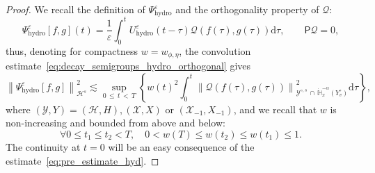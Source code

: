 \documentclass[10pt]{amsart}
\theoremstyle{definition}\newtheorem{defi}[theo]{Definition}\newtheorem{rema}[theo]{Remark}\newtheorem{exam}[theo]{Example}\newtheorem{exem}[theo]{Example}\newtheorem{nota}[theo]{Notation}
\newcommand{\hyd}{\mathrm{hydro}}
\renewcommand{\d}{\mathrm{d}}
\newcommand{\bbH}{\mathbb{H}}
\newcommand{\XX}{\mathcal{X}}
\newcommand{\HH}{\mathcal{H}}
\newcommand{\PP}{\mathsf{P}}
\newcommand{\QQ}{\mathcal{Q}}
\newcommand{\VV}{\mathcal{Y}}
\newcommand{\HHH}{\mathscr{H}}
\newcommand{\Ss}{H}
\newcommand{\SSs}{\HH}
\newcommand{\rSSSs}[1]{\HHH^{#1}}
\newcommand{\Sl}{X}
\newcommand{\SSl}{\XX}
\newcommand{\Sg}{Y}
\newcommand{\Sgm}{Y^{\circ}}
\newcommand{\SSg}{\VV}
\newcommand{\rSSgm}[1]{\VV^{\circ, #1}}
\renewcommand*\le{\leqslant}
\renewcommand*\leq{\leqslant}
\newcommand*\eps{{\varepsilon}}
\let\oldforall\forall
\renewcommand*{\forall}{\mathrel{\oldforall}}
\begin{document}
\begin{proof}
We recall the definition of $\Psi^\eps_\hyd$ and the orthogonality property of $\QQ$:
\[
\Psi^\eps_\hyd [f, g](t) = \frac{1}{\eps} \int_0^t U^\eps_\hyd(t-\tau) \QQ(f(\tau), g(\tau)) \d \tau, \qquad \PP \QQ = 0,
\]
thus, denoting for compactness $w = w_{\phi, \eta}$, the convolution estimate~\eqref{eq:decay_semigroups_hydro_orthogonal} gives
\begin{equation}\label{eq:pre_estimate_hyd}
\left\| \Psi^\eps_\hyd [f, g] \right\|_{\rSSSs{s}}^2 \lesssim \sup_{0\,\le\,t\,<\,T} \left\{w(t)^2 \int_0^t \left\| \QQ(f(\tau), g(\tau)) \right\|_{ \rSSgm{s}\,\cap\,\dot{\bbH}^{-\alpha}_x \left(\Sgm_v \right) }^2 \d \tau\right\},
\end{equation}
where $(\SSg, \Sg) = (\SSs, \Ss), (\SSl, \Sl)$ or $(\SSl_{-1}, \Sl_{-1})$, and we recall that $w$ is non-increasing and bounded from above and below:
\begin{equation}\label{eq:bound_w}
\forall 0 \leq t_1 \le t_2 < T, \quad 0 < w(T) \le w(t_2) \le w(t_1) \le 1.
\end{equation}
The continuity at $t = 0$ will be an easy consequence of the estimate~\eqref{eq:pre_estimate_hyd}.


\end{proof}
\end{document}
